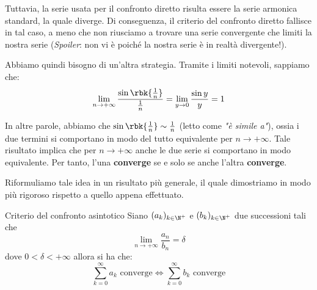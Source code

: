 \documentclass[a4paper, 12pt]{report}
\begin{document}
    Tuttavia, la serie usata per il confronto diretto risulta essere la serie armonica standard, la quale diverge. Di conseguenza, il criterio del confronto diretto fallisce in tal caso, a meno che non riusciamo a trovare una serie convergente che limiti la nostra serie (\textit{Spoiler}: non vi è poiché la nostra serie è in realtà divergente!).
    
    Abbiamo quindi bisogno di un'altra strategia. Tramite i limiti notevoli, sappiamo che:
    \[\lim_{n \to +\infty} \frac{\sin \rbk{\frac{1}{n}}}{\frac{1}{n}} = \lim_{y \to 0} \frac{\sin y}{y} = 1\]

    In altre parole, abbiamo che $\sin \rbk{\frac{1}{n}} \sim \frac{1}{n}$ (letto come \textit{"è simile a"}), ossia i due termini si comportano in modo del tutto equivalente per $n \to +\infty$. Tale risultato implica che per $n \to +\infty$ anche le due serie si comportano in modo equivalente. Per tanto, l'una \textbf{converge} se e solo se anche l'altra \textbf{converge}.

    Riformuliamo tale idea in un risultato più generale, il quale dimostriamo in modo più rigoroso rispetto a quello appena effettuato.

    \begin{framedthm}{Criterio del confronto asintotico}
        Siano $(a_k)_{k \in \N^+}$ e $(b_k)_{k \in \N^+}$ due successioni tali che
        \[ \lim_{n \to +\infty}  \frac{a_n}{b_n} = \delta\]
        dove $0 < \delta < +\infty$ allora si ha che:
        \[ \sum_{k=0}^{\infty} a_k \text{ converge} \iff \sum_{k=0}^{\infty} b_k \text{ converge}\]
    \end{framedthm}

    
\end{document}
